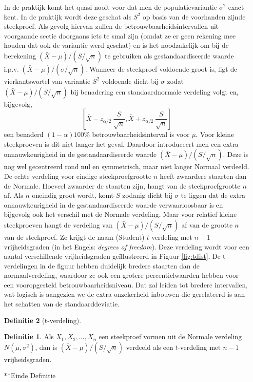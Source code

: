 \documentclass[
  12pt,dutch,coursenotes]{book}
\theoremstyle{definition}
\newtheorem{definition}{Definitie}[chapter]
\theoremstyle{definition}
\theoremstyle{definition}
\theoremstyle{remark}
\begin{document}
In de praktijk komt het quasi nooit voor dat men de populatievariantie \(\sigma^2\) exact kent. In de praktijk wordt deze geschat als \(S^2\) op basis van de voorhanden zijnde steekproef. Als gevolg hiervan zullen de betrouwbaarheidsintervallen uit voorgaande sectie doorgaans iets te smal zijn (omdat ze er geen rekening mee houden dat ook de variantie werd geschat) en is het
noodzakelijk om bij de berekening \((\bar{X} - \mu)/(S/\sqrt{n})\) te
gebruiken als gestandaardiseerde waarde i.p.v. \((\bar{X} - \mu)/(\sigma/\sqrt{n})\). Wanneer de steekproef voldoende groot is, ligt de vierkantswortel van variantie \(S^2\) voldoende dicht bij \(\sigma\) zodat \({(\bar{X} - \mu)}/{(S/\sqrt{n}) }\) bij benadering een standaardnormale verdeling volgt en, bijgevolg,
\begin{equation*}
\left[\bar{X} - z_{\alpha/2} \ \frac{S}{\sqrt{n}} , \bar{X} + z_{\alpha/2} \
\frac{S}{\sqrt{n}}\right]
\end{equation*}
een benaderd \((1- \alpha)100\%\) betrouwbaarheidsinterval is voor \(\mu\). Voor
kleine steekproeven is dit niet langer het geval. Daardoor introduceert men
een extra onnauwkeurigheid in de gestandaardiseerde waarde \({(\bar{X} - \mu)}/{(S/\sqrt{n})}\). Deze is nog wel gecentreerd rond nul en symmetrisch, maar niet langer Normaal verdeeld. De echte verdeling voor eindige
steekproefgrootte \(n\) heeft zwaardere staarten dan de Normale. Hoeveel
zwaarder de staarten zijn, hangt van de steekproefgrootte \(n\) af. Als \(n\)
oneindig groot wordt, komt \(S\) zodanig dicht bij \(\sigma\) te liggen dat de
extra onnauwkeurigheid in de gestandaardiseerde waarde verwaarloosbaar is en
bijgevolg ook het verschil met de Normale verdeling. Maar voor relatief
kleine steekproeven hangt de verdeling van \({(\bar{X} - \mu)}/({S/\sqrt{n}})\) af van de grootte \(n\) van de steekproef. Ze krijgt de naam (Student) \(t\)-verdeling met \(n-1\) vrijheidsgraden (in het Engels: \emph{degrees of freedom}). Deze verdeling wordt voor een aantal verschillende vrijheidsgraden geïllustreerd in Figuur \ref{fig:tdist}.
De t-verdelingen in de figuur hebben duidelijk bredere staarten dan de normaalverdeling, waardoor ze ook een grotere percentielwaarden hebben voor een vooropgesteld betrouwbaarheidsniveau.
Dat zal leiden tot bredere intervallen, wat logisch is aangezien we de extra onzekerheid inbouwen die gerelateerd is aan het schatten van de standaarddeviatie.

\begin{definition}[t-verdeling]
\begin{definition}

\protect\hypertarget{def:unnamed-chunk-150}{}{\label{def:unnamed-chunk-150} \iffalse (t-verdeling) \fi{} }Als \(X_1, X_2, ..., X_n\) een steekproef vormen uit de Normale verdeling \(N(\mu, \sigma^2)\), dan is \((\bar{X} - \mu)/(S/\sqrt{n})\) verdeeld als een \(t\)-verdeling met \(n-1\) vrijheidsgraden.

**Einde Definitie

\end{definition}
\end{definition}
\end{document}
